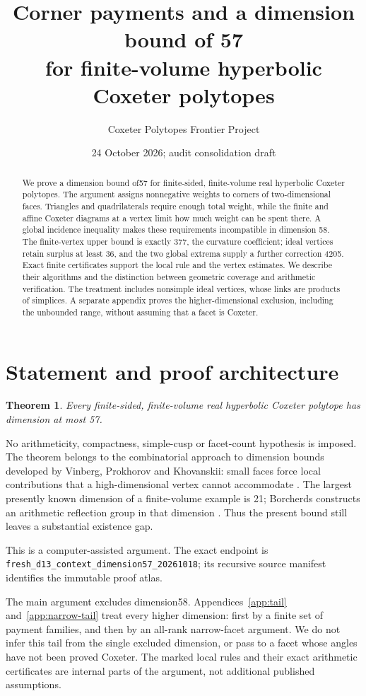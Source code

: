 \documentclass[11pt]{article}
\title{Corner payments and a dimension bound of 57\\
for finite-volume hyperbolic Coxeter polytopes}
\author{Coxeter Polytopes Frontier Project}
\date{24 October 2026; audit consolidation draft}
\newtheorem{theorem}{Theorem}
\theoremstyle{remark}\newtheorem{remark}[theorem]{Remark}
\newcommand{\cert}[1]{\nolinkurl{#1}}
\begin{document}
\maketitle
\begin{abstract}
We prove a dimension bound of57 for finite-sided, finite-volume real
hyperbolic Coxeter polytopes. The argument assigns nonnegative weights
to corners of two-dimensional faces. Triangles and quadrilaterals require
enough total weight, while the finite and affine Coxeter diagrams at a
vertex limit how much weight can be spent there. A global incidence
inequality makes these requirements incompatible in dimension 58.
The finite-vertex upper bound is exactly 377, the curvature coefficient;
ideal vertices retain surplus at least 36, and the two global extrema
supply a further correction 4205. Exact finite certificates support the
local rule and the vertex estimates. We describe their algorithms and
the distinction between geometric coverage and arithmetic verification.
The treatment includes nonsimple ideal vertices, whose links are products
of simplices. A separate appendix proves the higher-dimensional exclusion,
including the unbounded range, without assuming that a facet is Coxeter.
\end{abstract}

\section{Statement and proof architecture}
\begin{theorem}\label{thm:main}
Every finite-sided, finite-volume real hyperbolic Coxeter polytope has
dimension at most 57.
\end{theorem}
No arithmeticity, compactness, simple-cusp or facet-count hypothesis is
imposed. The theorem belongs to the combinatorial approach to dimension
bounds developed by Vinberg, Prokhorov and Khovanskii: small faces
force local contributions that a high-dimensional vertex cannot
accommodate \cite{Prokhorov,Khovanskii}. The largest presently known
dimension of a finite-volume example is 21; Borcherds constructs an
arithmetic reflection group in that dimension \cite{Borcherds}.
Thus the present bound still leaves a substantial existence gap.

This is a computer-assisted argument. The exact endpoint is
\cert{fresh_d13_context_dimension57_20261018}; its recursive source
manifest identifies the immutable proof atlas.

The main argument excludes dimension58. Appendices~\ref{app:tail}
and~\ref{app:narrow-tail} treat every higher dimension: first by a finite
set of payment families, and then by an all-rank narrow-facet argument.
We do not infer this tail from the single excluded dimension, or pass
to a facet whose angles have not been proved Coxeter. The marked local
rules and their exact arithmetic certificates are internal parts of
the argument, not additional published assumptions.
\end{document}
